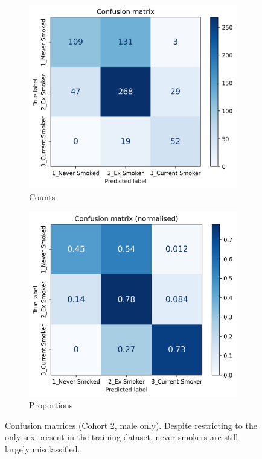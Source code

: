 \documentclass[draft]{article} %
\begin{document}
\begin{figure}[!p]
    \centering
    \begin{subfigure}{0.42\linewidth}
        \centering
        \includegraphics[width=\linewidth]{cohort2/male_only/test_confusion_matrix.png}
        \caption{Counts}
    \end{subfigure}
    \hspace{4mm}
    \begin{subfigure}{0.42\linewidth}
        \centering
        \includegraphics[width=\linewidth]{cohort2/male_only/test_confusion_matrix_normalised.png}
        \caption{Proportions}
    \end{subfigure}
    \caption[Confusion matrices (Cohort 2, male only)]{Confusion matrices (Cohort 2, male only). Despite restricting to the only sex present in the training dataset, never-smokers are still largely misclassified.}
    \label{fig:male-only-confusion-matrix}
\end{figure}
\end{document}
